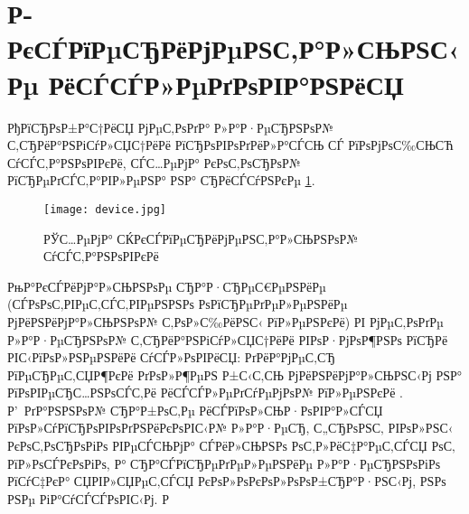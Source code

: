 \section{Р­РєСЃРїРµСЂРёРјРµРЅС‚Р°Р»СЊРЅС‹Рµ РёСЃСЃР»РµРґРѕРІР°РЅРёСЏ}

РђРїСЂРѕР±Р°С†РёСЏ РјРµС‚РѕРґР° Р»Р°Р·РµСЂРЅРѕР№ С‚СЂРёР°РЅРіСѓР»СЏС†РёРё РїСЂРѕРІРѕРґРёР»Р°СЃСЊ СЃ РїРѕРјРѕС‰СЊСЋ СѓСЃС‚Р°РЅРѕРІРєРё, СЃС…РµРјР° РєРѕС‚РѕСЂРѕР№ РїСЂРµРґСЃС‚Р°РІР»РµРЅР° РЅР° СЂРёСЃСѓРЅРєРµ \ref{ris:device}.

\begin{figure}[h]
\begin{center}
\texttt{[image: device.jpg]}
\end{center}\vspace*{-3mm}
\caption{РЎС…РµРјР° СЌРєСЃРїРµСЂРёРјРµРЅС‚Р°Р»СЊРЅРѕР№ СѓСЃС‚Р°РЅРѕРІРєРё}
\label{ris:device}
\end{figure}

РњР°РєСЃРёРјР°Р»СЊРЅРѕРµ СЂР°Р·СЂРµС€РµРЅРёРµ (СЃРѕРѕС‚РІРµС‚СЃС‚РІРµРЅРЅРѕ РѕРїСЂРµРґРµР»РµРЅРёРµ РјРёРЅРёРјР°Р»СЊРЅРѕР№ С‚РѕР»С‰РёРЅС‹ РїР»РµРЅРєРё) РІ РјРµС‚РѕРґРµ Р»Р°Р·РµСЂРЅРѕР№ С‚СЂРёР°РЅРіСѓР»СЏС†РёРё РІРѕР·РјРѕР¶РЅРѕ РїСЂРё РІС‹РїРѕР»РЅРµРЅРёРё СѓСЃР»РѕРІРёСЏ: РґРёР°РјРµС‚СЂ РїРµСЂРµС‚СЏР¶РєРё РґРѕР»Р¶РµРЅ Р±С‹С‚СЊ РјРёРЅРёРјР°Р»СЊРЅС‹Рј РЅР° РїРѕРІРµСЂС…РЅРѕСЃС‚Рё РёСЃСЃР»РµРґСѓРµРјРѕР№ РїР»РµРЅРєРё \cite{andreev, burkov, barishnikov}. Р’~РґР°РЅРЅРѕР№ СЂР°Р±РѕС‚Рµ РёСЃРїРѕР»СЊР·РѕРІР°Р»СЃСЏ РїРѕР»СѓРїСЂРѕРІРѕРґРЅРёРєРѕРІС‹Р№ Р»Р°Р·РµСЂ, С„СЂРѕРЅС‚ РІРѕР»РЅС‹ РєРѕС‚РѕСЂРѕРіРѕ РІРµСЃСЊРјР° СЃРёР»СЊРЅРѕ РѕС‚Р»РёС‡Р°РµС‚СЃСЏ РѕС‚ РїР»РѕСЃРєРѕРіРѕ, Р° СЂР°СЃРїСЂРµРґРµР»РµРЅРёРµ Р»Р°Р·РµСЂРЅРѕРіРѕ РїСѓС‡РєР° СЏРІР»СЏРµС‚СЃСЏ РєРѕР»РѕРєРѕР»РѕРѕР±СЂР°Р·РЅС‹Рј, РЅРѕ РЅРµ РіР°СѓСЃСЃРѕРІС‹Рј. Р